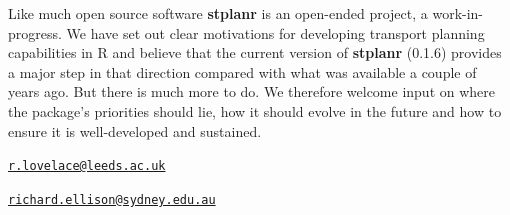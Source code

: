 Like much open source software \textbf{stplanr} is an open-ended
project, a work-in-progress. We have set out clear motivations for
developing transport planning capabilities in R and believe that the
current version of \textbf{stplanr} (0.1.6) provides a major step in
that direction compared with what was available a couple of years ago.
But there is much more to do. We therefore welcome input on where the
package's priorities should lie, how it should evolve in the future and
how to ensure it is well-developed and sustained.



\address{%
Robin Lovelace\\
University of Leeds\\
34-40 University Road\\ LS2 9JT, UK\\
}
\href{mailto:r.lovelace@leeds.ac.uk}{\nolinkurl{r.lovelace@leeds.ac.uk}}

\address{%
Richard Ellison\\
University of Sydney\\
378 Abercrombie Street\\ Darlington, NSW 2008, Australia\\
}
\href{mailto:richard.ellison@sydney.edu.au}{\nolinkurl{richard.ellison@sydney.edu.au}}



